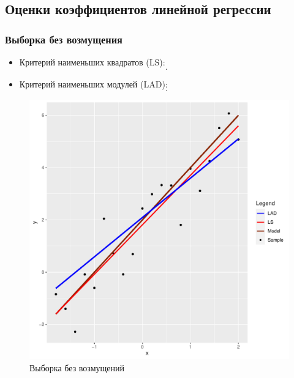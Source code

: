 \documentclass[a4paper]{article}
\begin{document}
\subsection{Оценки коэффициентов линейной регрессии}
\subsubsection{Выборка без возмущения}
\begin{itemize}
    \item Критерий наименьших квадратов (LS):
    \[
    .
    \]
    \item Критерий наименьших модулей (LAD):
    \[
    .
    \]
\end{itemize}
\begin{figure}[H]
    \centering
    \includegraphics[width = 12 cm ]{LabSrcs/resources/usual_sample_regression.pdf}
    \caption{Выборка без возмущений}
    \label{fig:usr}
\end{figure}
\end{document}

